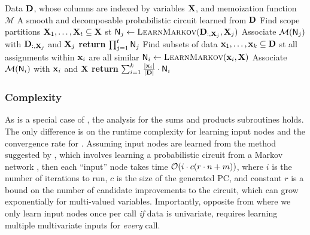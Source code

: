 \begin{algorithm}[t]
  \caption{}\label{alg:extendid}
  \begin{algorithmic}[1]
    \Require Data $\mathbf{D}$, whose columns are indexed by variables $\mathbf{X}$, and memoization
      function $\mathcal{M}$
    \Ensure A smooth and decomposable probabilistic circuit learned from $\mathbf{D}$
    \State Find scope partitions $\mathbf{X}_1,\ldots,\mathbf{X}_t\subseteq\mathbf{X}$ st
        \State $\Node_j\gets\textproc{LearnMarkov}(\set{D}_{:,\set{X}_j},\set{X}_j)$
        \State Associate $\mathcal{M}(\operatorname{\textup{\textsf{N}}}_j)$ with $\mathbf{D}_{:,\mathbf{X}_j}$ and $\mathbf{X}_j$
      \EndFor
      \State \textbf{return} $\prod_{j=1}^t \operatorname{\textup{\textsf{N}}}_j$
    \Else
      \State Find subsets of data $\mathbf{x}_1,\ldots,\mathbf{x}_k\subseteq\mathbf{D}$ st all assignments
        within $\mathbf{x}_i$ are all similar
        \State $\Node_i\gets\textproc{LearnMarkov}(\set{x}_i,\set{X})$
        \State Associate $\mathcal{M}(\operatorname{\textup{\textsf{N}}}_i)$ with $\mathbf{x}_i$ and $\mathbf{X}$
      \EndFor
      \State \textbf{return} $\sum_{i=1}^k \frac{|\mathbf{x}_i|}{|\mathbf{D}|}\cdot\operatorname{\textup{\textsf{N}}}_i$
    \EndIf
  \end{algorithmic}
\end{algorithm}

\subsubsection{Complexity}

As  is a special case of , the analysis for the sums and
products subroutines holds. The only difference is on the runtime complexity for learning input
nodes and the convergence rate for . Assuming input nodes are learned from the
method suggested by \citet{rooshenas14}, which involves learning a probabilistic circuit from a
Markov network \citep{lowd13a}, then each ``input'' node takes time $\mathcal{O}(i\cdot c(r\cdot n+m))$,
where $i$ is the number of iterations to run, $c$ is the size of the generated PC, and constant $r$
is a bound on the number of candidate improvements to the circuit, which can grow exponentially for
multi-valued variables. Importantly, opposite from  where we only learn input
nodes once per call \emph{if} data is univariate,  requires learning multiple
multivariate inputs for \emph{every}  call.

